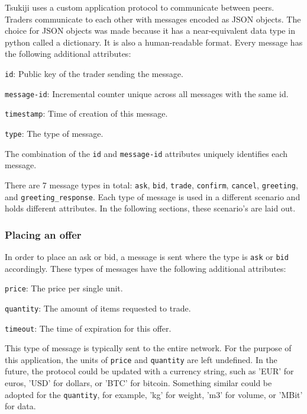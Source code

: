 Tsukiji uses a custom application protocol to communicate between peers.
Traders communicate to each other with messages encoded as JSON objects.
The choice for JSON objects was made because it has a near-equivalent data type in python called a dictionary.
It is also a human-readable format.
Every message has the following additional attributes:
\begin{myitemize}
\item \texttt{id}: Public key of the trader sending the message.
\item \texttt{message-id}: Incremental counter unique across all messages with the same id.
\item \texttt{timestamp}: Time of creation of this message.
\item \texttt{type}: The type of message.
\end{myitemize}
The combination of the \texttt{id} and \texttt{message-id} attributes uniquely identifies each message.

There are 7 message types in total: \texttt{ask}, \texttt{bid}, \texttt{trade}, \texttt{confirm}, \texttt{cancel}, \texttt{greeting}, and \texttt{greeting\_response}. Each type of message is used in a different scenario and holds different attributes. In the following sections, these scenario's are laid out.

\subsubsection{Placing an offer}
In order to place an ask or bid, a message is sent where the type is \texttt{ask} or \texttt{bid} accordingly.
These types of messages have the following additional attributes:
\begin{myitemize}
\item \texttt{price}: The price per single unit.
\item \texttt{quantity}: The amount of items requested to trade.
\item \texttt{timeout}: The time of expiration for this offer.
\end{myitemize}
This type of message is typically sent to the entire network.
For the purpose of this application, the units of \texttt{price} and \texttt{quantity} are left undefined.
In the future, the protocol could be updated with a currency string, such as 'EUR' for euros, 'USD' for dollars, or 'BTC' for bitcoin.
Something similar could be adopted for the \texttt{quantity}, for example, 'kg' for weight, 'm3' for volume, or 'MBit' for data.

